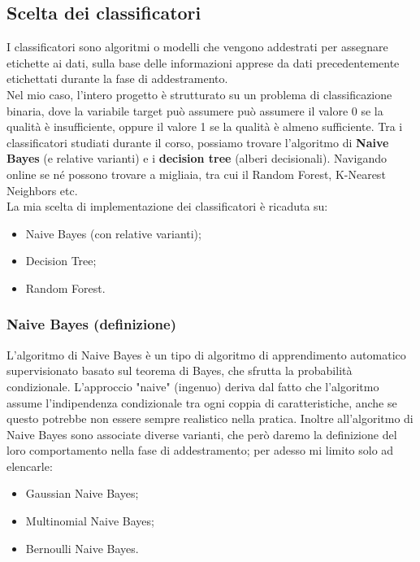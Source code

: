\documentclass{article}
\begin{document}
\begin{titlepage}
        \subsection{Scelta dei classificatori}
        I classificatori sono algoritmi o modelli che vengono addestrati per assegnare etichette ai dati, sulla base delle informazioni apprese da dati precedentemente etichettati durante la fase di addestramento. \\
        Nel mio caso, l'intero progetto è strutturato su un problema di classificazione binaria, dove la variabile target può assumere può assumere il valore 0 se la qualità è insufficiente, oppure il valore 1 se la qualità è almeno sufficiente. Tra i classificatori studiati durante il corso, possiamo trovare l'algoritmo di \textbf{Naive Bayes} (e relative varianti) e i \textbf{decision tree} (alberi decisionali). Navigando online se né possono trovare a migliaia, tra cui il Random Forest, K-Nearest Neighbors etc. \\
        La mia scelta di implementazione dei classificatori è ricaduta su:
        \begin{itemize}
            \item Naive Bayes (con relative varianti);
            \item Decision Tree;
            \item Random Forest.
        \end{itemize}

        \subsubsection{Naive Bayes (definizione)}
        L'algoritmo di Naive Bayes è un tipo di algoritmo di apprendimento automatico supervisionato basato sul teorema di Bayes, che sfrutta la probabilità condizionale. L'approccio "naive" (ingenuo) deriva dal fatto che l'algoritmo assume l'indipendenza condizionale tra ogni coppia di caratteristiche, anche se questo potrebbe non essere sempre realistico nella pratica.
        Inoltre all'algoritmo di Naive Bayes sono associate diverse varianti, che però daremo la definizione del loro comportamento nella fase di addestramento; per adesso mi limito solo ad elencarle:
        \begin{itemize}
            \item Gaussian Naive Bayes;
            \item Multinomial Naive Bayes;
            \item Bernoulli Naive Bayes.
        \end{itemize}


\end{titlepage}
\end{document}
